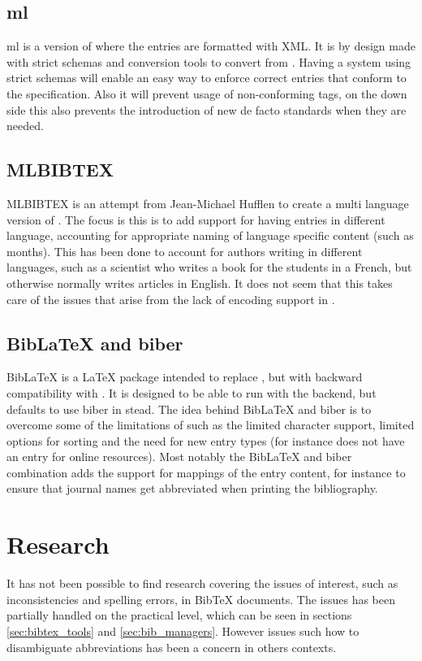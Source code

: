 \subsection{{\bibtex}ml}
{\bibtex}ml is a version of {\bibtex} where the entries are formatted
with XML.  It is by design made with strict schemas and conversion
tools to convert from {\bibtex}.  Having a system using strict schemas
will enable an easy way to enforce correct entries that conform to the
specification.  Also it will prevent usage of non-conforming tags, on
the down side this also prevents the introduction of new de facto
standards when they are needed\cite{gunhen2007_bibtexml}.


\subsection{MLBIBTEX}
MLBIBTEX is an attempt from Jean-Michael Hufflen to create a multi
language version of {\bibtex}.  The focus is this is to add support
for having entries in different language, accounting for appropriate
naming of language specific content (such as months).  This has been
done to account for authors writing in different languages, such as a
scientist who writes a book for the students in a French, but
otherwise normally writes articles in English.  It does not seem that
this takes care of the issues that arise from the lack of encoding
support in {\bibtex}\cite{hufflen2001_mlbibtex}.


\subsection{Bib{\LaTeX} and biber}
Bib{\LaTeX} is a {\LaTeX} package intended to replace {\bibtex}, but
with backward compatibility with {\bibtex}.  It is designed to be able
to run with the {\bibtex} backend, but defaults to use biber in stead.
The idea behind Bib{\LaTeX} and biber is to overcome some of the
limitations of {\bibtex} such as the limited character support,
limited options for sorting and the need for new entry types (for
instance {\bibtex} does not have an entry for online resources).  Most
notably the Bib{\LaTeX} and biber combination adds the support for
mappings of the entry content, for instance to ensure that journal
names get abbreviated when printing the bibliography.


\section{Research }
It has not been possible to find research covering the issues of
interest, such as inconsistencies and spelling errors, in Bib{\TeX}
documents.  The issues has been partially handled on the practical
level, which can be seen in sections \ref{sec:bibtex_tools} and
\ref{sec:bib_managers}.  However issues such how to disambiguate
abbreviations has been a concern in others contexts.


